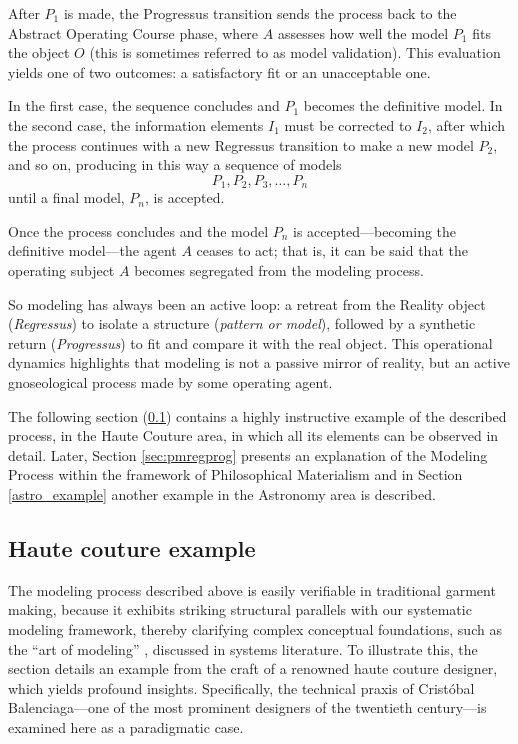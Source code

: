 \documentclass[11pt, a4paper]{article}
\begin{document}
After $P_1$ is made, the Progressus transition sends the process back to the Abstract Operating Course phase, where $A$ assesses how well the model $P_1$ fits the object $O$  (this is sometimes referred to as model validation). This evaluation yields one of two outcomes: a satisfactory fit or an unacceptable one.

In the first case, the sequence concludes and $P_1$ becomes the definitive model. In the second case, the information elements $I_1$ must be corrected to $I_2$, after which the process continues with a new Regressus transition to make a new model $P_2$, and so on, producing in this way a sequence of models
\[
P_1, P_2, P_3, \ldots, P_n
\]
until a final model, $P_n$, is accepted.

Once the process concludes and the model $P_n$ is accepted—becoming the definitive model—the agent $A$ ceases to act; that is, it can be said that the operating subject $A$ becomes segregated from the modeling process.

So modeling has always been an active loop: a retreat from the Reality object (\textit{Regressus}) to isolate a structure (\textit{pattern or model}), followed by a synthetic return (\textit{Progressus}) to fit and compare it with the real object. This operational dynamics highlights that modeling is not a passive mirror of reality, but an active gnoseological process made by some operating agent.

The following section (\ref{haute_couture}) contains a highly instructive example  of the described process, in the Haute Couture area,  in which all its elements can be observed in detail. Later, Section \ref{sec:pmregprog} presents an explanation of the Modeling Process within the framework of Philosophical Materialism and in Section \ref{astro_example} another example in the Astronomy area is described.



\subsection{Haute couture example} \label{haute_couture}


The modeling process described above is easily verifiable in traditional garment making, because it exhibits striking structural parallels with our systematic modeling framework, thereby clarifying complex conceptual foundations, such as the ``art of modeling'' \cite{morris1967art}, discussed in systems literature. To illustrate this, the section details an example from the craft of a renowned haute couture designer, which yields profound insights. Specifically, the technical praxis of Cristóbal Balenciaga---one of the most prominent designers of the twentieth century---is examined here as a paradigmatic case.
\end{document}
